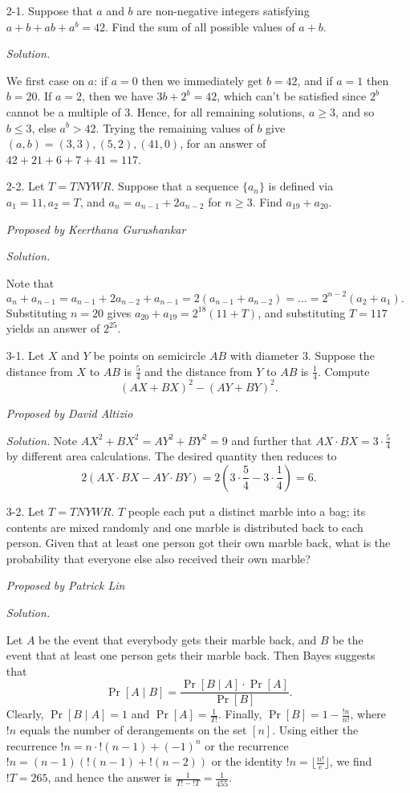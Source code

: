 \documentclass[10pt]{article}
\newcommand{\proposed}[1]
{
\vspace{5pt}
\noindent\textit{Proposed by #1}
}
\newcommand{\solution}
{
\vspace{5pt}
\noindent\textit{Solution.}\qquad
}
\begin{document}
\begin{enumerate}
\item[2-1.] Suppose that $a$ and $b$ are non-negative integers satisfying $a + b + ab + a^b = 42$. Find the sum of all possible values of $a + b$.

\solution
We first case on $a$: if $a = 0$ then we immediately get $b = 42$, and if $a = 1$ then $b = 20$. If $a = 2$, then we have $3b + 2^b = 42$, which can't be satisfied since $2^b$ cannot be a multiple of 3. Hence, for all remaining solutions, $a \ge 3$, and so $b \le 3$, else $a^b > 42$. Trying the remaining values of $b$ give $(a,b) = (3,3),(5,2),(41,0)$, for an answer of $42+21+6+7+41=\boxed{117}$.


\item[2-2.] Let $T = TNYWR$. Suppose that a sequence $\{a_n\}$ is defined via $a_1 = 11, a_2 = T$, and $a_n = a_{n-1} + 2a_{n-2}$ for $n \ge 3$. Find $a_{19} + a_{20}$.

\proposed{Keerthana Gurushankar}

\solution
Note that \[a_n + a_{n-1} = a_{n-1} + 2a_{n-2} + a_{n-1} = 2(a_{n-1}+a_{n-2}) = \dots = 2^{n-2}(a_2 + a_1).\] Substituting $n = 20$ gives $a_{20} + a_{19} = 2^{18}(11 + T)$, and substituting $T = 117$ yields an answer of $\boxed{2^{25}}$.


\item[3-1.] Let $X$ and $Y$ be points on semicircle $AB$ with diameter 3. Suppose the distance from $X$ to $AB$ is $\frac{5}{4}$ and the distance from $Y$ to $AB$ is $\frac{1}{4}$. Compute \[(AX+BX)^2 - (AY+BY)^2.\]

\proposed{David Altizio}

\solution Note $AX^2 + BX^2 = AY^2 + BY^2 = 9$ and further that $AX \cdot BX = 3\cdot\frac54$ by different area calculations. The desired quantity then reduces to \[2\left(AX \cdot BX - AY \cdot BY\right) = 2\left(3\cdot\frac54 - 3\cdot\frac14\right) = \boxed{6}.\]


\item[3-2.] Let $T = TNYWR$. $T$ people each put a distinct marble into a bag; its contents are mixed randomly and one marble is distributed back to each person. Given that at least one person got their own marble back, what is the probability that everyone else also received their own marble?

\proposed{Patrick Lin}

\solution
Let $A$ be the event that everybody gets their marble back, and $B$ be the event that at least one person gets their marble back. Then Bayes suggests that
\[\Pr[A \mid B] = \frac{\Pr[B \mid A]\cdot\Pr[A]}{\Pr[B]}.\]
Clearly, $\Pr[B \mid A] = 1$ and $\Pr[A] = \tfrac{1}{T!}$. Finally, $\Pr[B] = 1 - \frac{!n}{n!}$, where $!n$ equals the number of derangements on the set $[n]$. Using either the recurrence $!n = n \cdot !(n-1) + (-1)^n$ or the recurrence $!n = (n-1)(!(n-1) + !(n-2))$ or the identity $!n = \lfloor \frac{n!}{e}\rfloor$, we find $!T = 265$, and hence the answer is $\frac{1}{T!-!T} = \boxed{\tfrac{1}{455}}$.



\end{enumerate}
\end{document}
